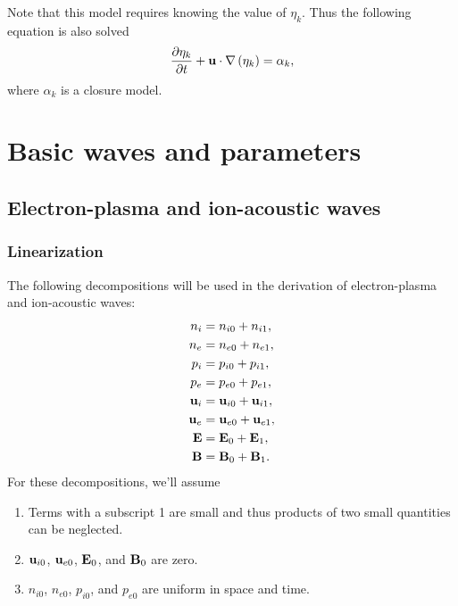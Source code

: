 \documentclass[a4paper,11pt]{report}
\begin{document}
Note that this model requires knowing the value of $\eta_k$. Thus the following equation is also solved
\begin{equation}
    \frac{\partial \eta_k}{\partial t} + \mathbf{u} \cdot \nabla \left( \eta_k \right) = \alpha_k,
\end{equation}
where $\alpha_k$ is a closure model.

\chapter{Basic waves and parameters}

\section{Electron-plasma and ion-acoustic waves}

\subsection{Linearization}
\label{sec:p_waves_linearization}
The following decompositions will be used in the derivation of electron-plasma and ion-acoustic waves:
\begin{align}
    n_i &= n_{i0} + n_{i1}, \nonumber \\
    n_e &= n_{e0} + n_{e1}, \nonumber \\
    p_i &= p_{i0} + p_{i1}, \nonumber \\
    p_e &= p_{e0} + p_{e1}, \nonumber \\
    \mathbf{u}_i &= \mathbf{u}_{i0} + \mathbf{u}_{i1}, \nonumber \\
    \mathbf{u}_e &= \mathbf{u}_{e0} + \mathbf{u}_{e1}, \nonumber \\
    \mathbf{E} &= \mathbf{E}_0 + \mathbf{E}_1, \nonumber \\
    \mathbf{B} &= \mathbf{B}_0 + \mathbf{B}_1.
\end{align}
For these decompositions, we'll assume
\begin{enumerate}
    \item Terms with a subscript 1 are small and thus products of two small quantities can be neglected. \label{it:p_waves_assumption_1}
    \item $\mathbf{u}_{i0}$, $\mathbf{u}_{e0}$, $\mathbf{E}_0$, and $\mathbf{B}_0$ are zero. \label{it:p_waves_assumption_2}
    \item $n_{i0}$, $n_{e0}$, $p_{i0}$, and $p_{e0}$ are uniform in space and time. \label{it:p_waves_assumption_3}
\end{enumerate}
\end{document}
